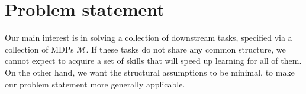 \documentclass{article} %
\newcommand{\mdpset}{\mathcal{M}}
\begin{document}
    


\section{Problem statement}

Our main interest is in solving a collection of downstream tasks, specified via a collection of MDPs $\mdpset$. If these tasks do not share any common structure, we cannot expect to acquire a set of skills that will speed up learning for all of them. On the other hand, we want the structural assumptions to be minimal, to make our problem statement more generally applicable.
\end{document}
